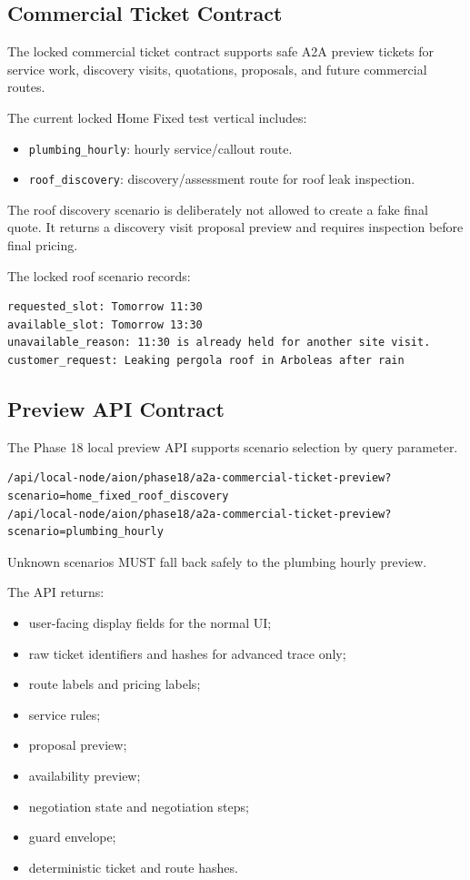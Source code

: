 \subsection{Commercial Ticket Contract}

The locked commercial ticket contract supports safe A2A preview tickets for service work, discovery visits, quotations, proposals, and future commercial routes.

The current locked Home Fixed test vertical includes:

\begin{itemize}
  \item \texttt{plumbing\_hourly}: hourly service/callout route.
  \item \texttt{roof\_discovery}: discovery/assessment route for roof leak inspection.
\end{itemize}

The roof discovery scenario is deliberately not allowed to create a fake final quote. It returns a discovery visit proposal preview and requires inspection before final pricing.

The locked roof scenario records:

\begin{verbatim}
requested_slot: Tomorrow 11:30
available_slot: Tomorrow 13:30
unavailable_reason: 11:30 is already held for another site visit.
customer_request: Leaking pergola roof in Arboleas after rain
\end{verbatim}

\subsection{Preview API Contract}

The Phase 18 local preview API supports scenario selection by query parameter.

\begin{verbatim}
/api/local-node/aion/phase18/a2a-commercial-ticket-preview?scenario=home_fixed_roof_discovery
/api/local-node/aion/phase18/a2a-commercial-ticket-preview?scenario=plumbing_hourly
\end{verbatim}

Unknown scenarios MUST fall back safely to the plumbing hourly preview.

The API returns:

\begin{itemize}
  \item user-facing display fields for the normal UI;
  \item raw ticket identifiers and hashes for advanced trace only;
  \item route labels and pricing labels;
  \item service rules;
  \item proposal preview;
  \item availability preview;
  \item negotiation state and negotiation steps;
  \item guard envelope;
  \item deterministic ticket and route hashes.
\end{itemize}

